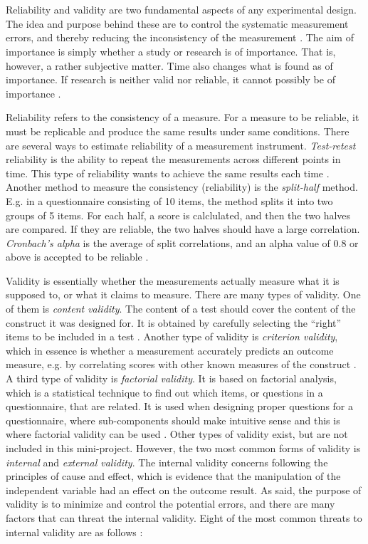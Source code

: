 \hspace{0pt} \\
\\
Reliability and validity are two fundamental aspects of any experimental design. The idea and purpose behind these are to control the systematic measurement errors, and thereby reducing the inconsistency of the measurement \citep[p. 44-48]{Design}. The aim of importance is simply whether a study or research is of importance. That is, however, a rather subjective matter. Time also changes what is found as of importance. If research is neither valid nor reliable, it cannot possibly be of importance \citep[p. 54]{Design}.

Reliability refers to the consistency of a measure. For a measure to be reliable, it must be replicable and produce the same results under same conditions. There are several ways to estimate reliability of a measurement instrument. \textit{Test-retest} reliability is the ability to repeat the measurements across different points in time. This type of reliability wants to achieve the same results each time \citep[p. 47]{Design}. Another method to measure the consistency (reliability) is the \textit{split-half} method. E.g. in a questionnaire consisting of 10 items, the method splits it into two groups of 5 items. For each half, a score is calclulated, and then the two halves are compared. If they are reliable, the two halves should have a large correlation. \textit{Cronbach’s alpha} is the average of split correlations, and an alpha value of 0.8 or above is accepted to be reliable \citep[p. 48]{Design}.

Validity is essentially whether the measurements actually measure what it is supposed to, or what it claims to measure. There are many types of validity. One of them is \textit{content validity}. The content of a test should cover the content of the construct it was designed for. It is obtained by carefully selecting the “right” items to be included in a test \citep[p. 44-46]{Design}. Another type of validity is \textit{criterion validity}, which in essence is whether a measurement accurately predicts an outcome measure, e.g. by correlating scores with other known measures of the construct \citep[p. 46-47]{Design}. A third type of validity is \textit{factorial validity}. It is based on factorial analysis, which is a statistical technique to find out which items, or questions in a questionnaire, that are related. It is used when designing proper questions for a questionnaire, where sub-components should make intuitive sense and this is where factorial validity can be used \citep[p. 47]{Design}. Other types of validity exist, but are not included in this mini-project. However, the two most common forms of validity is \textit{internal} and \textit{external validity}. The internal validity concerns following the principles of cause and effect, which is evidence that the manipulation of the independent variable had an effect on the outcome result. As said, the purpose of validity is to minimize and control the potential errors, and there are many factors that can threat the internal validity. Eight of the most common threats to internal validity are as follows \citep[p. 58-62]{Design}:

